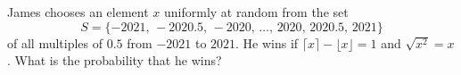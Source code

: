 James chooses an element $x$ uniformly at random from the set
\[S=\{-2021,\,-2020.5,\,-2020,\,\dots,\,2020,\,2020.5,\,2021\}\]
of all multiples of $0.5$ from $-2021$ to $2021$. He wins if $\lceil x\rceil-\lfloor x\rfloor=1$ and $\sqrt{x^2}=x$. What is the probability that he wins?
